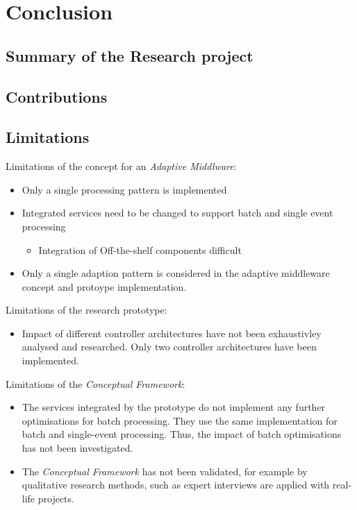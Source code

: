 \chapter{Conclusion}\label{ch:conclusion}

\section{Summary of the Research project}

\section{Contributions}

\section{Limitations}

Limitations of the concept for an \emph{Adaptive Middlware}:
\begin{itemize}
	\item Only a single processing pattern is implemented
	\item Integrated services need to be changed to support batch and single event processing
	\begin{itemize}
		\item Integration of Off-the-shelf components difficult
	\end{itemize}
	\item Only a single adaption pattern is considered in the adaptive middleware concept and protoype implementation.
\end{itemize}

Limitations of the research prototype:
\begin{itemize}
	\item Impact of different controller architectures have not been exhaustivley analysed and researched. Only two controller architectures have been implemented. 
\end{itemize}

Limitations of the \emph{Conceptual Framework}:
\begin{itemize}
	\item The services integrated by the prototype do not implement any further optimisations for batch processing. They use the same implementation for batch and single-event processing. Thus, the impact of batch optimisations has not been investigated.
	\item The \emph{Conceptual Framework} has not been validated, for example by qualitative research methods, such as expert interviews are applied with real-life projects.
\end{itemize}

